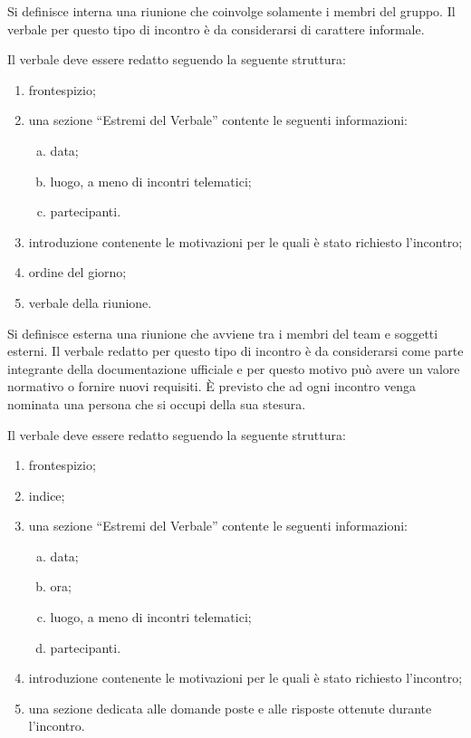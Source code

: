 \documentclass[../NormeProgetto.tex]{subfiles}
\begin{document}
			Si definisce interna una riunione che coinvolge solamente i membri del gruppo. Il verbale per questo tipo di incontro è da considerarsi di carattere informale. 
			
			Il verbale deve essere redatto seguendo la seguente struttura:
			\begin{enumerate}
				\item frontespizio;
				\item una sezione ``Estremi del Verbale'' contente le seguenti informazioni:
				\begin{enumerate}[a.]
					\item data;
					\item luogo, a meno di incontri telematici;
					\item partecipanti.
				\end{enumerate}
				\item introduzione contenente le motivazioni per le quali è stato richiesto l'incontro;
				\item ordine del giorno;
				\item verbale della riunione.
			\end{enumerate}

			Si definisce esterna una riunione che avviene tra i membri del team e soggetti esterni. Il verbale redatto per questo tipo di incontro è da considerarsi come parte integrante della documentazione ufficiale e per questo motivo può avere un valore normativo o fornire nuovi requisiti. È previsto che ad ogni incontro venga nominata una persona che si occupi della sua stesura.
			
			Il verbale deve essere redatto seguendo la seguente struttura:
			\begin{enumerate}
				\item frontespizio;
				\item indice;
				\item una sezione ``Estremi del Verbale'' contente le seguenti informazioni:
				\begin{enumerate}[a.]
					\item data;
					\item ora;
					\item luogo, a meno di incontri telematici;
					\item partecipanti.
				\end{enumerate}
				\item introduzione contenente le motivazioni per le quali è stato richiesto l'incontro;
				\item una sezione dedicata alle domande poste e alle risposte ottenute durante l'incontro.
			\end{enumerate}
			
\end{document}
